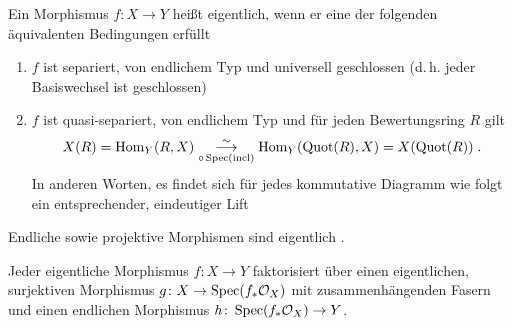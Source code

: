 \documentclass[german]{scrreprt}
\begin{document}
\begin{Definition}
  Ein Morphismus $f\colon X\to Y$ heißt eigentlich, wenn er eine der
  folgenden äquivalenten Bedingungen erfüllt
  \begin{enumerate}[label=(\roman*)]
  \item $f$ ist separiert, von endlichem Typ und universell
    geschlossen (d.\,h. jeder Basiswechsel ist geschlossen)
  \item $f$ ist quasi-separiert, von endlichem Typ und für jeden
    Bewertungsring $R$ gilt
    \begin{gather*}
      X(R)=\operatorname{Hom}_Y(R, X) 
      \overset{\sim}{\underset{\circ\operatorname{Spec}(\operatorname{incl})}
        {\longrightarrow}}
      \operatorname{Hom}_Y(\operatorname{Quot}(R), X)=X(\operatorname{Quot}(R))\;.
    \end{gather*}
    In anderen Worten, es findet sich für jedes kommutative Diagramm
    wie folgt ein entsprechender, eindeutiger Lift
    \begin{center}
    \end{center}
  \end{enumerate}
  Endliche sowie projektive Morphismen sind eigentlich
  \cite[9.5, Remark 5 und Theorem 9]{bosch}.

  \begin{Bemerkung}
    \cite[9.5, Theorem 12]{bosch}
    Jeder eigentliche Morphismus $f\colon X\to Y$ faktorisiert über
    einen eigentlichen, surjektiven Morphismus $g\colon X\to
    \operatorname{Spec}(f_*\mathcal{O}_X)$ mit zusammenhängenden Fasern und einen endlichen
    Morphismus $h\colon \operatorname{Spec}(f_*\mathcal{O}_X)\to Y$.
  \end{Bemerkung}
\end{Definition}

\begin{Satz}

\end{Satz}
\end{document}
